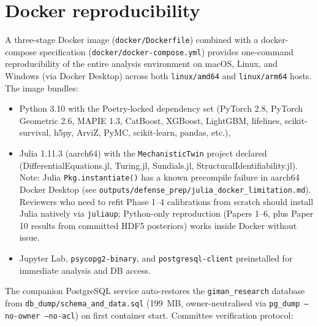 \section{Docker reproducibility}
\label{app:e:docker}

A three-stage Docker image (\texttt{docker/Dockerfile}) combined with a
docker-compose specification (\texttt{docker/docker-compose.yml}) provides
one-command reproducibility of the entire analysis environment on macOS,
Linux, and Windows (via Docker Desktop) across both \texttt{linux/amd64} and
\texttt{linux/arm64} hosts. The image bundles:

\begin{itemize}
  \item Python 3.10 with the Poetry-locked dependency set (PyTorch 2.8,
    PyTorch Geometric 2.6, MAPIE 1.3, CatBoost, XGBoost, LightGBM, lifelines,
    scikit-survival, h5py, ArviZ, PyMC, scikit-learn, pandas, etc.),
  \item Julia 1.11.3 (aarch64) with the \texttt{MechanisticTwin} project
    declared (DifferentialEquations.jl, Turing.jl, Sundials.jl,
    StructuralIdentifiability.jl). Note: Julia \texttt{Pkg.instantiate()} has a
    known precompile failure in aarch64 Docker Desktop (see
    \texttt{outputs/defense\_prep/julia\_docker\_limitation.md}). Reviewers who
    need to refit Phase 1--4 calibrations from scratch should install Julia
    natively via \texttt{juliaup}; Python-only reproduction (Papers 1--6,
    plus Paper 10 results from committed HDF5 posteriors) works inside Docker
    without issue.
  \item Jupyter Lab, \texttt{psycopg2-binary}, and \texttt{postgresql-client}
    preinstalled for immediate analysis and DB access.
\end{itemize}

\noindent
The companion PostgreSQL service auto-restores the \texttt{giman\_research}
database from \texttt{db\_dump/schema\_and\_data.sql} (199~MB, owner-neutralised
via \texttt{pg\_dump --no-owner --no-acl}) on first container start. Committee
verification protocol:

